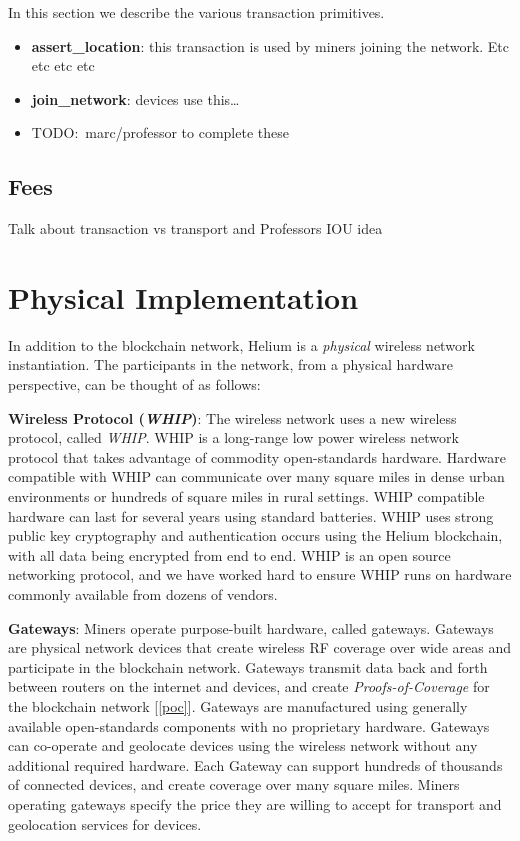 \documentclass[letterpaper,11pt]{article}
\newcommand{\todo}[1]{}
\renewcommand{\todo}[1]{{\color{red} TODO:\ {#1}}}
\begin{document}
In this section we describe the various transaction primitives.

\begin{itemize}
  \item \textbf{assert\_location}: this transaction is used by miners joining the network. Etc etc etc etc
  \item \textbf{join\_network}: devices use this\ldots
  \item \todo{marc/professor to complete these}
\end{itemize}

\subsection{Fees}

Talk about transaction vs transport and Professors IOU idea

\newpage

\section{Physical Implementation}

In addition to the blockchain network, Helium is a \emph{physical} wireless network instantiation. The participants in the network, from a physical hardware perspective, can be thought of as follows:

\textbf{Wireless Protocol (\emph{WHIP})}: The wireless network uses a new wireless protocol, called \emph{WHIP}. WHIP is a long-range low power wireless network protocol that takes advantage of commodity open-standards hardware. Hardware compatible with WHIP can communicate over many square miles in dense urban environments or hundreds of square miles in rural settings. WHIP compatible hardware can last for several years using standard batteries. WHIP uses strong public key cryptography and authentication occurs using the Helium blockchain, with all data being encrypted from end to end. WHIP is an open source networking protocol, and we have worked hard to ensure WHIP runs on hardware commonly available from dozens of vendors.

\textbf{Gateways}: Miners operate purpose-built hardware, called gateways. Gateways are physical network devices that create wireless RF coverage over wide areas and participate in the blockchain network. Gateways transmit data back and forth between routers on the internet and devices, and create \emph{Proofs-of-Coverage} for the blockchain network [\ref{poc}]. Gateways are manufactured using generally available open-standards components with no proprietary hardware. Gateways can co-operate and geolocate devices using the wireless network without any additional required hardware. Each Gateway can support hundreds of thousands of connected devices, and create coverage over many square miles. Miners operating gateways specify the price they are willing to accept for transport and geolocation services for devices.
\end{document}
